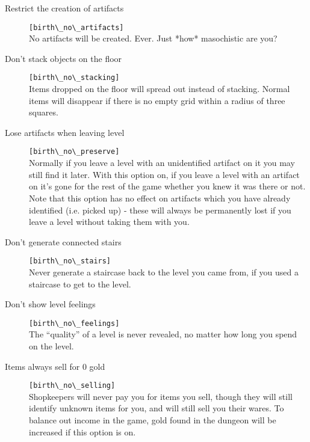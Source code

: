 \begin{description}
 \item[Restrict the creation of artifacts]
 \verb+[birth\_no\_artifacts]+\\
     No artifacts will be created. Ever. Just *how* masochistic are you?

\item[Don't stack objects on the floor] \verb+[birth\_no\_stacking]+\\
     Items dropped on the floor will spread out instead of stacking.
     Normal items will disappear if there is no empty grid within a radius
     of three squares.

\item[Lose artifacts when leaving level] \verb+[birth\_no\_preserve]+\\
     Normally if you leave a level with an unidentified artifact on it
     you may still find it later. With this option on, if you leave a level
     with an artifact on it's gone for the rest of the game whether you
     knew it was there or not. Note that this option has no effect on
     artifacts which you have already identified (i.e. picked up) - these
     will always be permanently lost if you leave a level without taking
     them with you.

\item[Don't generate connected stairs] \verb+[birth\_no\_stairs]+\\
     Never generate a staircase back to the level you came from, if you used
     a staircase to get to the level.

\item[Don't show level feelings] \verb+[birth\_no\_feelings]+\\
     The ``quality'' of a level is never revealed, no matter how long you
     spend on the level.

\item[Items always sell for 0 gold] \verb+[birth\_no\_selling]+\\
     Shopkeepers will never pay you for items you sell, though they will
     still identify unknown items for you, and will still sell you their
     wares. To balance out income in the game, gold found in the dungeon
     will be increased if this option is on.
\end{description}

